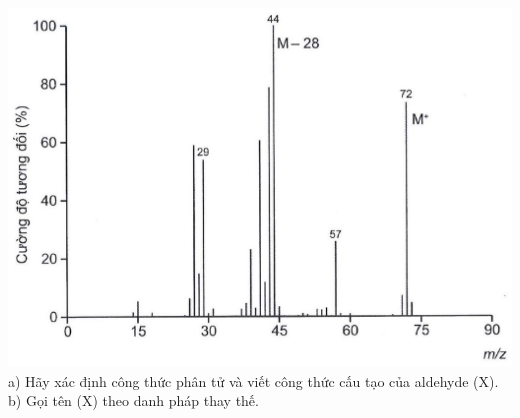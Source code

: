 \documentclass[10pt]{article}
\begin{document}
\includegraphics[max width=\textwidth, center]{2025_10_23_ae7aef68fb3b41082d29g-45(1)}\\
a) Hãy xác định công thức phân tử và viết công thức cấu tạo của aldehyde (X).\\
b) Gọi tên (X) theo danh pháp thay thế.
\end{document}
